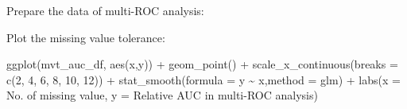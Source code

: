 \documentclass[
  12pt,
]{book}
\newenvironment{Shaded}{\begin{snugshade}}{\end{snugshade}}
\newcommand{\AttributeTok}[1]{\textcolor[rgb]{0.77,0.63,0.00}{#1}}
\newcommand{\CommentTok}[1]{\textcolor[rgb]{0.56,0.35,0.01}{\textit{#1}}}
\newcommand{\ControlFlowTok}[1]{\textcolor[rgb]{0.13,0.29,0.53}{\textbf{#1}}}
\newcommand{\DecValTok}[1]{\textcolor[rgb]{0.00,0.00,0.81}{#1}}
\newcommand{\FunctionTok}[1]{\textcolor[rgb]{0.00,0.00,0.00}{#1}}
\newcommand{\NormalTok}[1]{#1}
\newcommand{\OtherTok}[1]{\textcolor[rgb]{0.56,0.35,0.01}{#1}}
\newcommand{\SpecialCharTok}[1]{\textcolor[rgb]{0.00,0.00,0.00}{#1}}
\newcommand{\StringTok}[1]{\textcolor[rgb]{0.31,0.60,0.02}{#1}}
\begin{document}
Prepare the data of multi-ROC analysis:

\begin{Shaded}
\end{Shaded}

Plot the missing value tolerance:

\begin{Shaded}
\begin{Highlighting}[]
\FunctionTok{ggplot}\NormalTok{(mvt\_auc\_df, }\FunctionTok{aes}\NormalTok{(x,y)) }\SpecialCharTok{+}
  \FunctionTok{geom\_point}\NormalTok{() }\SpecialCharTok{+}
  \FunctionTok{scale\_x\_continuous}\NormalTok{(}\AttributeTok{breaks =} \FunctionTok{c}\NormalTok{(}\DecValTok{2}\NormalTok{, }\DecValTok{4}\NormalTok{, }\DecValTok{6}\NormalTok{, }\DecValTok{8}\NormalTok{, }\DecValTok{10}\NormalTok{, }\DecValTok{12}\NormalTok{)) }\SpecialCharTok{+} 
  \FunctionTok{stat\_smooth}\NormalTok{(}\AttributeTok{formula =}\NormalTok{ y }\SpecialCharTok{\textasciitilde{}}\NormalTok{ x,}\AttributeTok{method =} \StringTok{\textquotesingle{}glm\textquotesingle{}}\NormalTok{) }\SpecialCharTok{+}
  \FunctionTok{labs}\NormalTok{(}\AttributeTok{x =} \StringTok{\textquotesingle{}No. of missing value\textquotesingle{}}\NormalTok{, }
       \AttributeTok{y =} \StringTok{\textquotesingle{}Relative AUC in multi{-}ROC analysis\textquotesingle{}}\NormalTok{)}
\end{Highlighting}
\end{Shaded}
\end{document}
